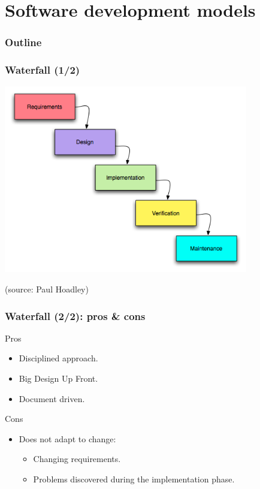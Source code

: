 \documentclass[10pt, handout]{beamer}
\begin{document}
\section{Software development models}

\begin{frame}
  \frametitle{Outline}
  \tableofcontents[currentsection]
\end{frame}

\begin{frame}[fragile]
  \frametitle{Waterfall (1/2)}
  \includegraphics[width=0.8\textwidth]{Waterfall_model}

  \tiny(source: Paul Hoadley)
\end{frame}
\begin{frame}[fragile]
  \frametitle{Waterfall (2/2): pros \& cons}
  \begin{exampleblock}{Pros}
    \begin{itemize}
    \item Disciplined approach.
    \item Big Design Up Front.
    \item Document driven.
    \end{itemize}
  \end{exampleblock}
  \begin{alertblock}{Cons}
    \begin{itemize}
    \item Does not adapt to change:
      \begin{itemize}
      \item Changing requirements.
      \item Problems discovered during the implementation phase.
      \end{itemize}
    \end{itemize}
  \end{alertblock}
\end{frame}
\end{document}
